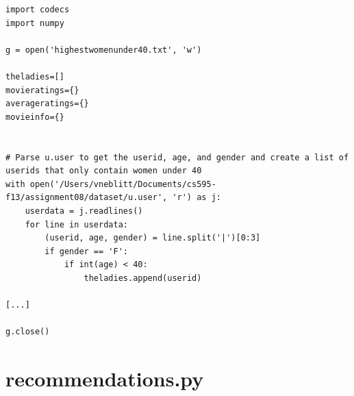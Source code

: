 \documentclass{article}
\begin{document}
\begin{lstlisting}[frame=single, caption=highestwomenunder40.py, label=highwomenunder40]
import codecs
import numpy

g = open('highestwomenunder40.txt', 'w')

theladies=[]
movieratings={}
averageratings={}
movieinfo={}


# Parse u.user to get the userid, age, and gender and create a list of userids that only contain women under 40
with open('/Users/vneblitt/Documents/cs595-f13/assignment08/dataset/u.user', 'r') as j:
	userdata = j.readlines()
	for line in userdata:
		(userid, age, gender) = line.split('|')[0:3]
		if gender == 'F':
			if int(age) < 40:
				theladies.append(userid)

[...]

g.close()
\end{lstlisting}

\newpage
\appendix
\section{recommendations.py}
\end{document}
